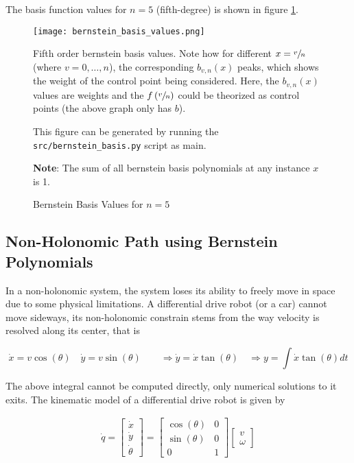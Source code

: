 The basis function values for $n=5$ (fifth-degree) is shown in figure \ref{fig:bernstein-basis-plots}.

\begin{figure}[ht]
    \centering
    \texttt{[image: bernstein\_basis\_values.png]}
    \caption{Bernstein Basis Values for $n=5$}
    \label{fig:bernstein-basis-plots}
    \small
        Fifth order bernstein basis values. Note how for different $x = \sfrac{v}{n}$ (where $v = 0,\dots,n$), the corresponding $b_{v,n}(x)$ peaks, which shows the weight of the control point being considered. Here, the $b_{v,n}(x)$ values are weights and the $f\left(\sfrac{v}{n}\right)$ could be theorized as control points (the above graph only has $b$).

        This figure can be generated by running the \texttt{src/bernstein\_basis.py} script as main.

        \textbf{Note}: The sum of all bernstein basis polynomials at any instance $x$ is 1.
\end{figure}

\subsection{Non-Holonomic Path using Bernstein Polynomials}

In a non-holonomic system, the system loses its ability to freely move in space due to some physical limitations. A differential drive robot (or a car) cannot move sideways, its non-holonomic constrain stems from the way velocity is resolved along its center, that is

\begin{equation}
    \dot{x} = v \cos(\theta) \quad 
    \dot{y} = v \sin(\theta) \quad\quad
    \Rightarrow \dot{y} = \dot{x} \tan(\theta) \quad
    \Rightarrow y = \int{\dot{x} \tan \left ( \theta \right ) dt}
    \label{eq:diffdrive-non-holo-constraint}
\end{equation}

The above integral cannot be computed directly, only numerical solutions to it exits. The kinematic model of a differential drive robot is given by

\begin{align*}
    \dot{q} = \begin{bmatrix}
        \dot{x} \\ \dot{y} \\ \dot{\theta}
    \end{bmatrix} = \begin{bmatrix}
    \cos(\theta) & 0 \\
    \sin(\theta) & 0 \\
    0 & 1
    \end{bmatrix} \begin{bmatrix}
    v \\ \omega
    \end{bmatrix}
\end{align*}

